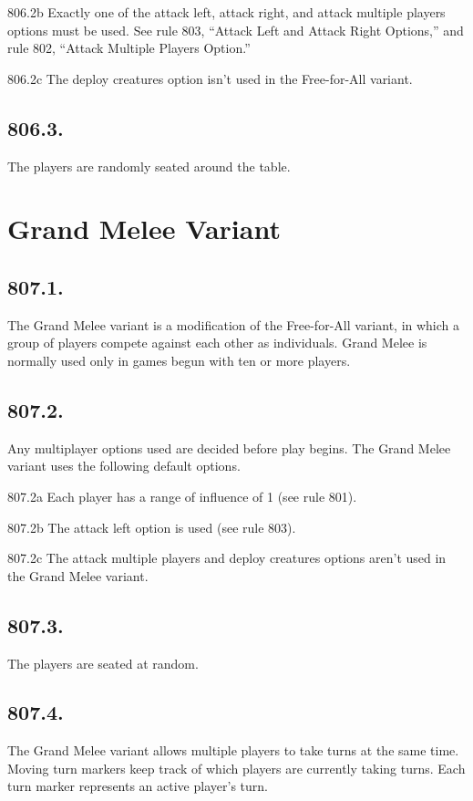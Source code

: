 806.2b Exactly one of the attack left, attack right, and attack multiple players options must be used. See rule 803, “Attack Left and Attack Right Options,” and rule 802, “Attack Multiple Players Option.”

806.2c The deploy creatures option isn’t used in the Free-for-All variant.

\subsection*{806.3.}
The players are randomly seated around the table.

\section{Grand Melee Variant}
\subsection*{807.1.}
The Grand Melee variant is a modification of the Free-for-All variant, in which a group of players compete against each other as individuals. Grand Melee is normally used only in games begun with ten or more players.

\subsection*{807.2.}
Any multiplayer options used are decided before play begins. The Grand Melee variant uses the following default options.

807.2a Each player has a range of influence of 1 (see rule 801).

807.2b The attack left option is used (see rule 803).

807.2c The attack multiple players and deploy creatures options aren’t used in the Grand Melee variant.

\subsection*{807.3.}
The players are seated at random.

\subsection*{807.4.}
The Grand Melee variant allows multiple players to take turns at the same time. Moving turn markers keep track of which players are currently taking turns. Each turn marker represents an active player’s turn.

